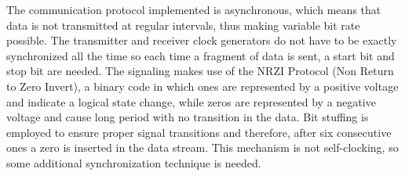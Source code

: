 \documentclass{article}
\begin{document}
The communication protocol implemented is asynchronous, which means that data is not transmitted at regular intervals, thus making variable bit rate possible. The transmitter and receiver clock generators do not have to be exactly synchronized all the time so each time a fragment of data is sent, a start bit and stop bit are needed.
\newline
\newline
The signaling makes use of the NRZI Protocol (Non Return to Zero Invert), a binary code in which ones are represented by a positive voltage and indicate a logical state change, while zeros are represented by a negative voltage and cause long period with no transition in the data. Bit stuffing is employed to ensure proper signal transitions and therefore, after six consecutive ones a zero is inserted in the data stream.
This mechanism is not self-clocking, so some additional synchronization technique is needed.
\end{document}
